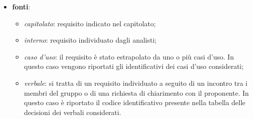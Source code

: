\begin{itemize}
	\item{\textbf{fonti}}:   
		\begin{itemize}
			\item \textit{capitolato}: requisito indicato nel capitolato; 
			\item \textit{interno}: requisito individuato dagli analisti; 
			\item \textit{caso d'uso}: il requisito è stato estrapolato da uno o più casi d'uso. In questo caso vengono riportati gli identificativi dei casi d'uso considerati; 
			\item \textit{verbale}: si tratta di un requisito individuato a seguito di un incontro tra i membri del gruppo o di una richiesta di chiarimento con il proponente. 
			In questo caso è riportato il codice identificativo presente nella tabella delle decisioni dei verbali considerati. 
		\end{itemize} 
\end{itemize}
